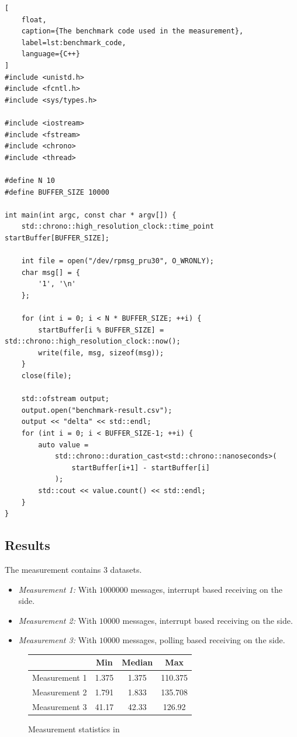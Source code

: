\begin{lstlisting}[
	float,
	caption={The benchmark code used in the measurement},
	label=lst:benchmark_code,
	language={C++}
]
#include <unistd.h>
#include <fcntl.h>
#include <sys/types.h>

#include <iostream>
#include <fstream>
#include <chrono>
#include <thread>

#define N 10
#define BUFFER_SIZE 10000

int main(int argc, const char * argv[]) {
	std::chrono::high_resolution_clock::time_point startBuffer[BUFFER_SIZE];

	int file = open("/dev/rpmsg_pru30", O_WRONLY);
	char msg[] = {
		'1', '\n'
	};

	for (int i = 0; i < N * BUFFER_SIZE; ++i) {
		startBuffer[i % BUFFER_SIZE] = std::chrono::high_resolution_clock::now();
		write(file, msg, sizeof(msg));
	}
	close(file);

	std::ofstream output;
	output.open("benchmark-result.csv");
	output << "delta" << std::endl;
	for (int i = 0; i < BUFFER_SIZE-1; ++i) {
		auto value =
			std::chrono::duration_cast<std::chrono::nanoseconds>(
				startBuffer[i+1] - startBuffer[i]
			);
		std::cout << value.count() << std::endl;
	}
}
\end{lstlisting}

\subsection{Results}

The measurement contains 3 datasets.
\begin{itemize}
	\item \emph{Measurement 1:} With $1000000$ messages, interrupt based receiving on the \pru{} side.
	\item \emph{Measurement 2:} With $10000$ messages, interrupt based receiving on the \pru{} side.
	\item \emph{Measurement 3:} With $10000$ messages, polling based receiving on the \pru{} side.
\end{itemize}

\begin{figure}
	\centering
	\caption{Measurement statistics in \si{\mics}}
	\begin{tabular}{l c c c}
		\toprule
		& Min & Median & Max \\
		\midrule
		Measurement 1 & 1.375 & 1.375 & 110.375 \\
		Measurement 2 & 1.791 & 1.833 & 135.708 \\
		Measurement 3 & 41.17 & 42.33 & 126.92 \\
		\bottomrule
	\end{tabular}
\end{figure}

